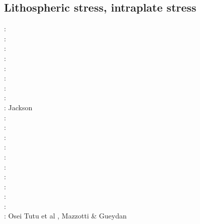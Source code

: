 \subsection{Lithospheric stress, intraplate stress}

\begin{scriptsize}
\nineteenseventyfive: \cite{fouy75}\cite{sosr75}\\
\nineteenseventysix: \cite{riss76}\\
\nineteenseventyseven: \cite{chtu77}\\
\nineteenseventynine: \cite{riss79}\\
\nineteeneightynine: \cite{boww89}\\
\nineteenninetyone: \cite{worg91}\\
\nineteenninetytwo: \cite{rich92}\cite{wuvr92}\cite{zoba92}\cite{clko92}\\
\twothousandone: \cite{stsm01}\\
\twothousandtwo: Jackson \cite{jack02}\\
\twothousandfour: \cite{ligu04}\\
\twothousandfive: \cite{timr05}\\
\twothousandseven: \cite{hert07}\\
\twothousandeight: \cite{bilr08}\cite{ghhw08}\\
\twothousandnine: \cite{ghhf09}\cite{nacl09}\\
\twothousandten: \cite{bepo10}\cite{yosh10}\\
\twothousandtwelve: \cite{nalr12}\cite{ghho12}\cite{wagw12}\\
\twothousandthirteen: \cite{ghhw13}\cite{wagw13}\\
\twothousandfourteen: \cite{vagw14}\\
\twothousandseventeen: \cite{grrb17}\\
\twothousandeighteen: Osei Tutu et al \cite{osss18}, Mazzotti \& Gueydan \cite{magu18}
\end{scriptsize}

